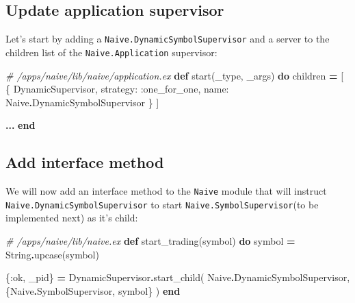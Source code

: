 \documentclass[
]{book}
\newenvironment{Shaded}{\begin{snugshade}}{\end{snugshade}}
\newcommand{\CommentTok}[1]{\textcolor[rgb]{0.56,0.35,0.01}{\textit{#1}}}
\newcommand{\ConstantTok}[1]{\textcolor[rgb]{0.00,0.00,0.00}{#1}}
\newcommand{\KeywordTok}[1]{\textcolor[rgb]{0.13,0.29,0.53}{\textbf{#1}}}
\newcommand{\NormalTok}[1]{#1}
\newcommand{\OperatorTok}[1]{\textcolor[rgb]{0.81,0.36,0.00}{\textbf{#1}}}
\newcommand{\VariableTok}[1]{\textcolor[rgb]{0.00,0.00,0.00}{#1}}
\begin{document}
\hypertarget{update-application-supervisor}{%
\subsection{Update application supervisor}\label{update-application-supervisor}}

Let's start by adding a \texttt{Naive.DynamicSymbolSupervisor} and a server to the children list of the \texttt{Naive.Application} supervisor:

\begin{Shaded}
\begin{Highlighting}[]
  \CommentTok{\# /apps/naive/lib/naive/application.ex}
  \KeywordTok{def}\NormalTok{ start(\_type, \_args) }\KeywordTok{do}
\NormalTok{    children }\OperatorTok{=}\NormalTok{ [}
\NormalTok{      \{}
        \ConstantTok{DynamicSupervisor}\NormalTok{,}
        \VariableTok{strategy:} \VariableTok{:one\_for\_one}\NormalTok{,}
        \VariableTok{name:} \ConstantTok{Naive}\OperatorTok{.}\ConstantTok{DynamicSymbolSupervisor}
\NormalTok{      \}}
\NormalTok{    ]}

    \OperatorTok{...}
  \KeywordTok{end}
\end{Highlighting}
\end{Shaded}

\hypertarget{add-interface-method}{%
\subsection{Add interface method}\label{add-interface-method}}

We will now add an interface method to the \texttt{Naive} module that will instruct \texttt{Naive.DynamicSymbolSupervisor} to start \texttt{Naive.SymbolSupervisor}(to be implemented next) as it's child:

\begin{Shaded}
\begin{Highlighting}[]
  \CommentTok{\# /apps/naive/lib/naive.ex}
  \KeywordTok{def}\NormalTok{ start\_trading(symbol) }\KeywordTok{do}
\NormalTok{    symbol }\OperatorTok{=} \ConstantTok{String}\OperatorTok{.}\NormalTok{upcase(symbol)}

\NormalTok{    \{}\VariableTok{:ok}\NormalTok{, \_pid\} }\OperatorTok{=}
      \ConstantTok{DynamicSupervisor}\OperatorTok{.}\NormalTok{start\_child(}
        \ConstantTok{Naive}\OperatorTok{.}\ConstantTok{DynamicSymbolSupervisor}\NormalTok{,}
\NormalTok{        \{}\ConstantTok{Naive}\OperatorTok{.}\ConstantTok{SymbolSupervisor}\NormalTok{, symbol\}}
\NormalTok{      )}
  \KeywordTok{end}
\end{Highlighting}
\end{Shaded}
\end{document}
